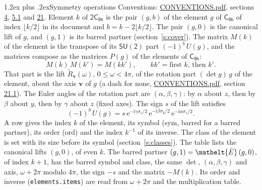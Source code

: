 \documentclass[10pt,a4paper]{article}
\makeatletter
\renewcommand\section{\@startsection{section}{1}{\z@}{-3ex plus -1ex minus -.2ex}%
  {1.2ex plus .2ex}{\normalfont\large\sffamily\bfseries\color{parttitle}}}
\numberwithin{equation}{section}
\newcommand{\eltfont}[1]{{\let\sigma\eltsigma\mathelt{#1}}}
\newcommand{\grp}[1]{\mathsf{#1}}
\newcommand{\elt}[1]{\eltfont{#1}}
\newcommand{\vv}{\mathbf{v}}
\newcommand{\iunit}{\mathrm{i}}
\newcommand{\expe}{\mathrm{e}}
\newcommand{\barred}[1]{\bar{#1}}
\newcommand{\lift}[1]{\tilde{#1}}
\newcommand{\pauli}[1]{\sigma_{#1}}
\makeatother
\begin{document}
\section{Symmetry operations}\label{s:elements}
Conventions: \href{../../CONVENTIONS.pdf}{CONVENTIONS.pdf}, sections \href{../../../rotation/CONVENTIONS.pdf\#conv.4}{4}, \href{../../../rotation/CONVENTIONS.pdf\#conv.5.1}{5.1} and \href{../../CONVENTIONS.pdf\#conv.21}{21}.
\leavevmode\label{n:index.element}\label{n:element.g}Element $k$ of $\grp{2C_{9h}}$ is the pair $(g, b)$ of the element $g$ of \href{../../../rotation/data/pdf/C9h.pdf}{$\grp{C_{9h}}$} of index $\lfloor k/2\rfloor$ in its document and $b = k - 2\lfloor k/2\rfloor$. The pair $(g, 0)$ is the canonical lift of $g$, and $(g, 1)$ is its barred partner (section~\ref{s:cover}). \label{n:matrix.element.pin}\label{n:matrix.element}The matrix $M(k)$ of the element is the transpose of its $\grp{SU(2)}$ part $(-1)^{b}\,U(g)$, and the matrices compose as the matrices $P(g)$ of the elements of $\grp{C_{9h}}$:
\begin{equation}\label{e:mprod}M(k)\,M(k') = M(kk'),\qquad kk' = \text{first } k\text{, then } k'.\end{equation}
\leavevmode\label{n:angle.omega}\label{n:vector.axis}\label{n:vector.pole}That part is the lift $\lift{R}_{\vv}(\omega)$, $0 \le \omega < 4\pi$, of the rotation part $(\det g)\,g$ of the element, about the axis $\vv$ of $g$ (a dash for none, \href{../../CONVENTIONS.pdf}{CONVENTIONS.pdf}, section \href{../../CONVENTIONS.pdf\#conv.21.1}{21.1}). \label{n:angle.euler.alpha}\label{n:angle.euler.beta}\label{n:angle.euler.gamma}\label{n:vector.coordinates}The Euler angles of the rotation part are $(\alpha,\beta,\gamma)$: by $\alpha$ about $z$, then by $\beta$ about $y$, then by $\gamma$ about $z$ (fixed axes). \label{n:local.euler.sign}The sign $s$ of the lift satisfies
\begin{equation}\label{e:euler}(-1)^{b}\,U(g) = s\,\expe^{-\iunit\gamma\pauli{z}/2}\,\expe^{-\iunit\beta\pauli{y}/2}\,\expe^{-\iunit\alpha\pauli{z}/2}.\end{equation}
\leavevmode\label{n:index.element.inverse}\label{n:head.sym}\label{n:head.ord}A row gives the index $k$ of the element, its symbol (sym, barred for a barred partner), its order (ord) and the index $k^{-1}$ of its inverse. \label{n:head.class}The class of the element is set with its size before its symbol (section~\ref{s:classes}).
The table lists the canonical lifts $(g, 0)$, of even $k$. The barred partner $(g, 1) = \elt{\barred{E}}\,(g, 0)$, of index $k + 1$, has the barred symbol and class, the same $\det$, $(\alpha,\beta,\gamma)$ and axis, $\omega + 2\pi$ modulo $4\pi$, the sign $-s$ and the matrix $-M(k)$. Its order and inverse (\texttt{elements.items}) are read from $\omega + 2\pi$ and the multiplication table.
\end{document}
